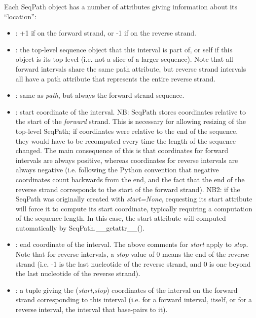 \documentclass{howto}
\begin{document}
Each SeqPath object has a number of attributes giving information about its
``location'':

\begin{itemize}

\item    
{}: +1 if on the forward strand, or -1 if on the reverse strand.

\item
{}: the top-level sequence object that this interval is part of, or self
if this object is its top-level (i.e. not a slice of a larger sequence).  Note that
all forward intervals share the same path attribute, but reverse strand intervals
all have a path attribute that represents the entire reverse strand.

\item
{}: same as {\em path}, but always the forward strand sequence.

\item
{}: start coordinate of the interval.  NB: SeqPath stores coordinates
relative to the start of the {\em forward} strand.  This is necessary for allowing
resizing of the top-level SeqPath; if coordinates were relative to the end of the
sequence, they would have to be recomputed every time the length of the sequence 
changed.  The main consequence of this is that coordinates for forward intervals
are always positive, whereas coordinates for reverse intervals are always 
negative (i.e. following the Python convention
that negative coordinates count backwards
from the end, and the fact that the end of the reverse strand corresponds to 
the start of the forward strand). NB2: if the SeqPath was originally created with
{\em start=None}, requesting its start attribute will force it to compute its start
coordinate, typically requiring a computation of the sequence length.  In this
case, the start attribute will computed automatically by SeqPath.__getattr__().

\item
{}: end coordinate of the interval.  The above comments for {\em start}
apply to {\em stop}.  Note that for reverse intervals, a {\em stop} value of 0
means the end of the reverse strand (i.e. -1 is the last nucleotide of the 
reverse strand, and 0 is one beyond the last nucleotide of the reverse strand).

\item
{}: a tuple giving the ({\em start,stop}) coordinates of the 
interval on the forward strand corresponding to this interval (i.e. for a 
forward interval, itself, or for a reverse interval, the interval that base-pairs
to it).

\end{itemize}
\end{document}
